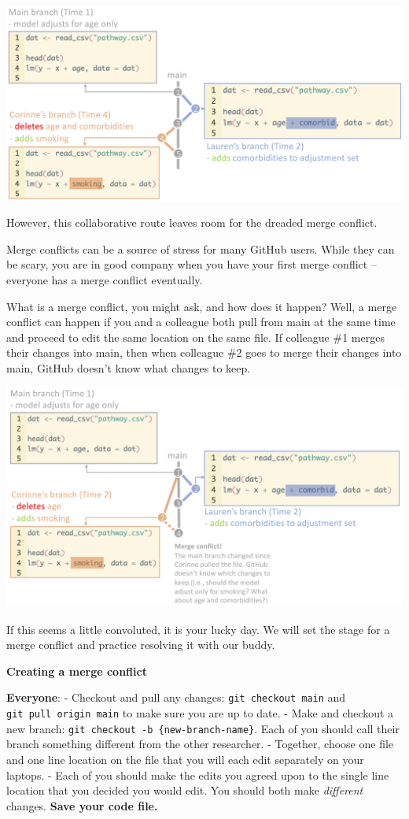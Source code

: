 \documentclass[
]{book}
\begin{document}
\includegraphics[width=1\linewidth]{./figures/no-conflict}

However, this collaborative route leaves room for the dreaded merge conflict.

Merge conflicts can be a source of stress for many GitHub users. While they can
be scary, you are in good company when you have your first merge conflict --
everyone has a merge conflict eventually.

What is a merge conflict, you might ask, and how does it happen? Well, a merge
conflict can happen if you and a colleague both pull from main at the same
time and proceed to edit the same location on the same file. If colleague \#1
merges their changes into main, then when colleague \#2
goes to merge their changes into main, GitHub doesn't know what changes to keep.

\includegraphics[width=1\linewidth]{./figures/conflict}

If this seems a little convoluted, it is your lucky day. We will set the stage
for a merge conflict and practice resolving it with our buddy.

\textbf{Creating a merge conflict}

\textbf{Everyone}:
- Checkout and pull any changes: \texttt{git\ checkout\ main} and \texttt{git\ pull\ origin\ main} to make sure you are up to date.
- Make and checkout a new branch: \texttt{git\ checkout\ -b\ \{new-branch-name\}}. Each of
you should call their branch something different from the other researcher.
- Together, choose one file and one line location on the file that you will each
edit separately on your laptops.
- Each of you should make the edits you agreed upon to the single line location that you decided you would edit. You should both make \emph{different} changes. \textbf{Save your code file.}
\end{document}
